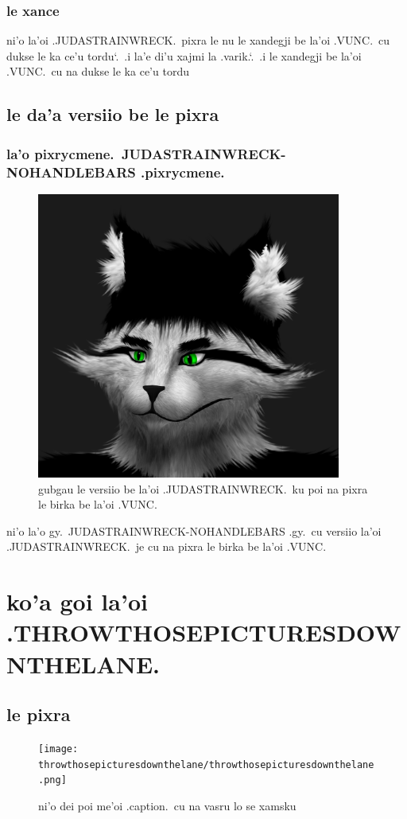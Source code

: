 \documentclass{report}
\newcommand\sds{\spacefactor\sfcode`.\ \space}
\begin{document}
\subsection{le xance}
ni'o la'oi .JUDASTRAINWRECK.\ pixra le nu le xandegji be la'oi .VUNC.\ cu dukse le ka ce'u tordu\sds  .i la'e di'u xajmi la .varik.\sds  .i le xandegji be la'oi .VUNC.\ cu na dukse le ka ce'u tordu

\section{le da'a versiio be le pixra}

\subsection{la'o pixrycmene.\ JUDASTRAINWRECK\hyp NOHANDLEBARS .pixrycmene.}
\begin{figure}[ht]
	\centering
	\includegraphics[width=10cm]{judastrainwreck/judastrainwreck-nohandlebars.png}
	\caption[center]{gubgau le versiio be la'oi .JUDASTRAINWRECK.\ ku poi na pixra le birka be la'oi .VUNC.}
\end{figure}
ni'o la'o gy.\ JUDASTRAINWRECK\hyp NOHANDLEBARS .gy.\ cu versiio la'oi .JUDASTRAINWRECK.\ je cu na pixra le birka be la'oi .VUNC.

\chapter{ko'a goi la'oi .THROWTHOSEPICTURESDOWNTHELANE.}
\section{le pixra}
\begin{figure}[ht]
	\centering
	\texttt{[image: throwthosepicturesdownthelane/throwthosepicturesdownthelane.png]}
	\caption[center]{ni'o dei poi me'oi .caption.\ cu na vasru lo se xamsku}
\end{figure}
\end{document}
